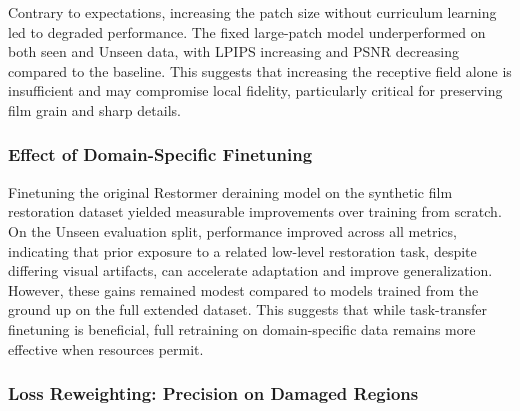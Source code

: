 \documentclass[10pt,a4paper,twocolumn,twoside]{article}
\begin{document}
Contrary to expectations, increasing the patch size without curriculum learning led to degraded performance. The fixed large-patch model underperformed on both seen and Unseen data, with LPIPS increasing and PSNR decreasing compared to the baseline. This suggests that increasing the receptive field alone is insufficient and may compromise local fidelity, particularly critical for preserving film grain and sharp details.
\subsubsection{Effect of Domain-Specific Finetuning}

Finetuning the original Restormer deraining model on the synthetic film restoration dataset yielded measurable improvements over training from scratch. On the Unseen evaluation split, performance improved across all metrics, indicating that prior exposure to a related low-level restoration task, despite differing visual artifacts, can accelerate adaptation and improve generalization. However, these gains remained modest compared to models trained from the ground up on the full extended dataset. This suggests that while task-transfer finetuning is beneficial, full retraining on domain-specific data remains more effective when resources permit.
\subsubsection{Loss Reweighting: Precision on Damaged Regions}
\end{document}
